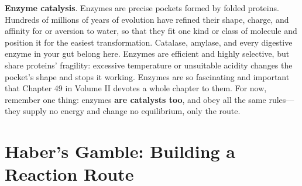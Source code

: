 \textbf{Enzyme catalysis}. Enzymes are precise pockets formed by folded proteins. Hundreds of millions of years of evolution have refined their shape, charge, and affinity for or aversion to water, so that they fit one kind or class of molecule and position it for the easiest transformation. Catalase, amylase, and every digestive enzyme in your gut belong here. Enzymes are efficient and highly selective, but share proteins' fragility: excessive temperature or unsuitable acidity changes the pocket's shape and stops it working. Enzymes are so fascinating and important that Chapter 49 in Volume II devotes a whole chapter to them. For now, remember one thing: enzymes \textbf{are catalysts too}, and obey all the same rules---they supply no energy and change no equilibrium, only the route.

\section{Haber's Gamble: Building a Reaction Route}

